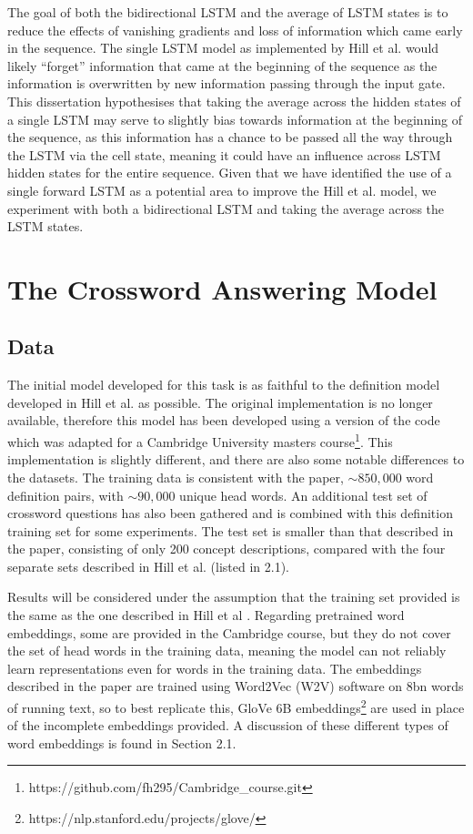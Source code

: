 \documentclass[11pt]{article}
\begin{document}
\begin{spacing}{1}
The goal of both the bidirectional LSTM and the average of LSTM states is to reduce the effects of vanishing gradients and loss of information which came early in the sequence. The single LSTM model as implemented by Hill et al. \citeyear{hill2015learning} would likely ``forget'' information that came at the beginning of the sequence as the information is overwritten by new information passing through the input gate. This dissertation hypothesises that taking the average across the hidden states of a single LSTM may serve to slightly bias towards information at the beginning of the sequence, as this information has a chance to be passed all the way through the LSTM via the cell state, meaning it could have an influence across LSTM hidden states for the entire sequence. Given that we have identified the use of a single forward LSTM as a potential area to improve the Hill et al. \citeyear{hill2015learning} model, we experiment with both a bidirectional LSTM and taking the average across the LSTM states.

\section{The Crossword Answering Model}
\subsection{Data}
The initial model developed for this task is as faithful to the definition model developed in Hill et al. \citeyear{hill2015learning} as possible. The original implementation is no longer available, therefore this model has been developed using a version of the code which was adapted for a Cambridge University masters course\footnote{https://github.com/fh295/Cambridge\_course.git}. This implementation is slightly different, and there are also some notable differences to the datasets. The training data is consistent with the paper, $\sim850,000$ word definition pairs, with $\sim90,000$ unique head words. An additional test set of crossword questions has also been gathered and is combined with this definition training set for some experiments. The test set is smaller than that described in the paper, consisting of only 200 concept descriptions, compared with the four separate sets described in Hill et al. \citeyear{hill2015learning} (listed in 2.1).

Results will be considered under the assumption that the training set provided is the same as the one described in Hill et al \citeyear{hill2015learning}. Regarding pretrained word embeddings, some are provided in the Cambridge course, but they do not cover the set of head words in the training data, meaning the model can not reliably learn representations even for words in the training data. The embeddings described in the paper are trained using Word2Vec (W2V) software \cite{mikolov2013efficient} on 8bn words of running text, so to best replicate this, GloVe \cite{pennington2014glove} 6B embeddings\footnote{https://nlp.stanford.edu/projects/glove/} are used in place of the incomplete embeddings provided. A discussion of these different types of word embeddings is found in Section 2.1.


\end{spacing}
\end{document}
